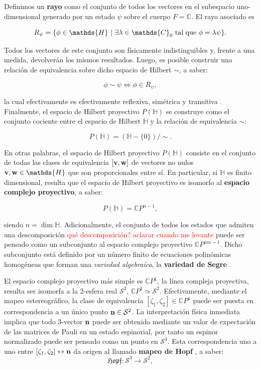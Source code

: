 \documentclass{report} %
\numberwithin{equation}{section}
\begin{document}
Definimos un \textbf{rayo} como el conjunto de todos los vectores en el subespacio uno-dimensional generado por un estado ${\psi}$ sobre el cuerpo $F = \mathds{C}$. El rayo asociado es 

$$
R_{\psi} = \{{\phi} \in \mathds{H}\textnormal{ | } \exists \lambda \in \mathds{C}_{0} \textnormal{ tal que } {\phi} = \lambda {\psi}\}.
$$

Todos los vectores de este conjunto son físicamente indistinguibles y, frente a una medida, devolverán los mismos resultados. Luego, es posible construir una relación de equivalencia sobre dicho espacio de Hilbert $\sim$, a saber:

$$
 \phi \sim \psi \Longleftrightarrow \phi \in R_{\psi},
$$

la cual efectivamente es efectivamente reflexiva, simétrica y transitiva \cite{munkres, GoldbartStone}. Finalmente, el espacio de Hilbert proyectivo $P(\mathds{H})$ se construye como el conjunto cociente entre el espacio de Hilbert $\mathds{H}$ y la relación de equivalencia $\sim$:

$$
P(\mathds{H}) = (\mathds{H}-\{0\})/\sim.
$$
 
En otras palabras, el espacio de Hilbert proyectivo $P(\mathds{H})$ consiste en el conjunto de todas las clases de equivalencia $[{\bf v}, {\bf w}]$ de vectores no nulos ${\bf v}, {\bf w} \in \mathds{H}$ que son proporcionales entre sí. En particular, si $\mathds{H}$ es finito dimensional, resulta que el espacio de Hilbert proyectivo es isomorfo al \textbf{espacio complejo proyectivo}, a saber:

\begin{equation}
    P(\mathds{H}) = \mathds{C}P^{n-1},
\end{equation}

siendo $n=\dim\mathds{H}$. Adicionalmente, el conjunto de todos los estados que admiten una descomposición \textcolor{red}{qué descomposición? aclarar cuando me levante} puede ser pensado como un subconjunto al espacio complejo proyectivo $\mathds{C}P^{nm-1}$. Dicho subconjunto está definido por un número finito de ecuaciones polinómicas homogéneas que forman una \textit{variedad algebraíca}, la \textbf{variedad de Segre} \cite{Hatcher:AT}. 

El espacio complejo proyectivo más simple es $\mathds{C}P^{1}$, la línea compleja proyectiva, resulta ser isomorfa a la 2-esfera real $\mathcal{S}^{2}$, $\mathds{C}P^{1} \simeq \mathcal{S}^{2}$. Efectivamente,
mediante el mapeo estereográfico, la clase de equivalencia $[\zeta_{1}, \zeta_{2}] \in \mathds{C}P^{1}$ puede ser puesta en correspondencia a un único punto ${\bf n} \in \mathcal{S}^{2}$. La interpretación física inmediata implica que todo 3-vector ${\bf n}$ puede ser obtenido mediante un valor de expectación de las matrices de Pauli en un estado espinorial, por tanto un espinor normalizado puede ser pensado como un punto en $\mathcal{S}^{3}$. Esta correspondencia uno a uno entre $[\zeta_1, \zeta_2] \leftrightarrow {\bf n}$ da origen al llamado \textbf{mapeo de Hopf} \cite{GoldbartStone}, a saber:
$$
\mathfrak{Hopf}: \mathcal{S}^{3} \rightarrow \mathcal{S}^{2},
$$
\end{document}
